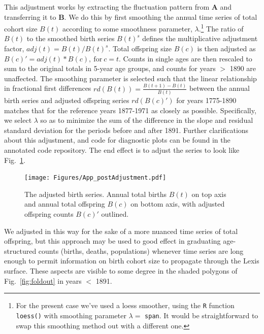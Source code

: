 \documentclass{article}
\begin{document}
\begin{appendix}
This adjustment works by extracting the fluctuation pattern from \textbf{A} and transferring it to \textbf{B}. We do this by first smoothing the annual time series of total cohort size $B(t)$ according to some smoothness parameter, $\lambda$.\footnote{For the present case we've used a loess smoother, using the \texttt{R} function \texttt{loess()} with smoothing parameter $\lambda =$ \texttt{span}. It would be straightforward to swap this smoothing method out with a different one.} The ratio of $B(t)$ to the smoothed birth series $B(t)^s$ defines the multiplicative adjustment factor, $adj(t) = B(t)/B(t)^s$. Total offspring size $B(c)$ is then adjusted as $B(c)' = adj(t)*B(c), \mathrm{~for~} c = t$. Counts in single ages are then rescaled to sum to the original totals in 5-year age groups, and counts for years $>$ 1890 are unaffected. The smoothing parameter is selected such that the linear relationship in fractional first differences $rd(B(t)) = \frac{B(t+1)-B(t)}{B(t)}$ between the annual birth series and adjusted offspring series $rd(B(c)')$ for years 1775-1890 matches that for the reference years 1877-1971 as closely as possible. Specifically, we select $\lambda$ so as to minimize the sum of the difference in the slope and residual standard deviation for the periods before and after 1891. Further clarifications about this adjustment, and code for diagnostic plots can be found in the annotated code repository. The end effect is to adjust the series to look like Fig.~\ref{fig:better}.

\begin{figure}[ht!]
\centering
 \texttt{[image: Figures/App\_postAdjustment.pdf]}
\caption{The adjusted birth series. Annual total births $B(t)$ on top axis and annual total offspring $B(c)$ on bottom axis, with adjusted offspring counts $B(c)'$ outlined.}
\label{fig:better}
\end{figure}
\end{appendix}

We adjusted in this way for the sake of a more nuanced time series of total offspring, but this approach may be used to good effect in graduating age-structured counts (births, deaths, populations) whenever time series are long enough to permit information on birth cohort size to propagate through the Lexis surface. These aspects are visible to some degree in the shaded polygons of Fig.~\ref{fig:foldout} in years $<$ 1891.
\end{document}
